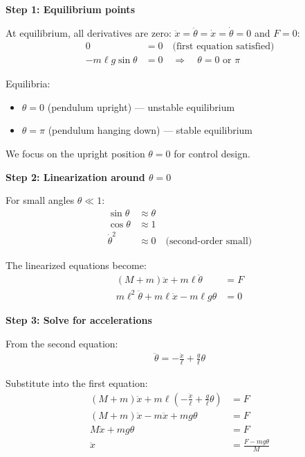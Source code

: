 \documentclass[11pt,a4paper]{article}
\begin{document}
\textbf{Step 1: Equilibrium points}

At equilibrium, all derivatives are zero: $\ddot{x} = \ddot{\theta} = \dot{x} = \dot{\theta} = 0$ and $F = 0$:
\begin{align}
  0 &= 0 \quad \text{(first equation satisfied)} \\
  -m\ell g\sin\theta &= 0 \quad \Rightarrow \quad \theta = 0 \text{ or } \pi
\end{align}

Equilibria:
\begin{itemize}
  \item $\theta = 0$ (pendulum upright) — unstable equilibrium
  \item $\theta = \pi$ (pendulum hanging down) — stable equilibrium
\end{itemize}

We focus on the upright position $\theta = 0$ for control design.

\textbf{Step 2: Linearization around $\theta = 0$}

For small angles $\theta \ll 1$:
\begin{align}
  \sin\theta &\approx \theta \\
  \cos\theta &\approx 1 \\
  \dot{\theta}^2 &\approx 0 \quad \text{(second-order small)}
\end{align}

The linearized equations become:
\begin{align}
  (M + m)\ddot{x} + m\ell\ddot{\theta} &= F \\
  m\ell^2\ddot{\theta} + m\ell\ddot{x} - m\ell g\theta &= 0
\end{align}

\textbf{Step 3: Solve for accelerations}

From the second equation:
\begin{align}
  \ddot{\theta} = -\frac{\ddot{x}}{\ell} + \frac{g}{\ell}\theta
\end{align}

Substitute into the first equation:
\begin{align}
  (M + m)\ddot{x} + m\ell\left(-\frac{\ddot{x}}{\ell} + \frac{g}{\ell}\theta\right) &= F \\
  (M + m)\ddot{x} - m\ddot{x} + mg\theta &= F \\
  M\ddot{x} + mg\theta &= F \\
  \ddot{x} &= \frac{F - mg\theta}{M}
\end{align}
\end{document}
